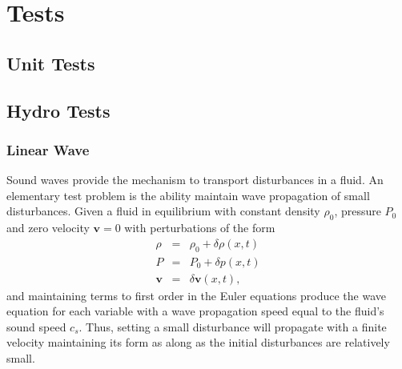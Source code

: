 \section{Tests}
\subsection{Unit Tests}

\subsection{Hydro Tests}
\subsubsection{Linear Wave}
Sound waves provide the mechanism to transport disturbances in a fluid. An
elementary test problem is the ability maintain wave propagation of small
disturbances. Given a fluid in equilibrium with constant density $\rho_0$,
pressure $P_0$ and zero velocity $\mathbf{v}=0$ with perturbations of the form
\begin{equation}
	\begin{array}{rcl}
		\rho & = & \rho_0 + \delta\rho(x,t) \\
   		 P & = & P_0 + \delta p(x,t) \\
    	\mathbf{v} & = & \delta\mathbf{v}(x,t),
    \end{array}
\end{equation}
and maintaining terms to first order in the Euler equations produce the wave
equation for each variable with a wave propagation speed equal to the fluid's sound speed 
$c_s$. Thus, setting a small disturbance 
will propagate with a finite velocity maintaining its form as along as the initial
disturbances are relatively small.

